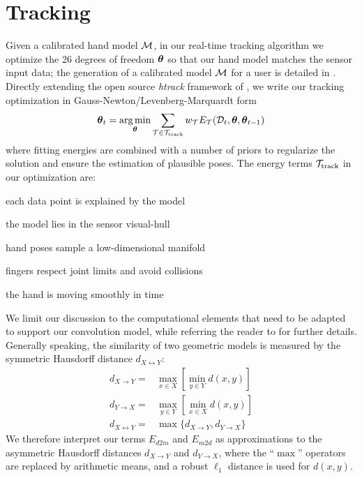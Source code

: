 

\section{Tracking}
\label{sec:tracking}
Given a calibrated hand model $\mathcal{M}$, in our real-time tracking algorithm we optimize the 26 degrees of freedom $\boldsymbol{\theta}$ so that our hand model matches the sensor input data; the generation of a calibrated model $\mathcal{M}$ for a user is detailed in . Directly extending the open source \emph{htrack} framework of \cite{tagliasacchi2015robust}, we write our tracking optimization in Gauss-Newton/Levenberg-Marquardt form
% 
\begin{eqnarray}
\boldsymbol{\theta}_t = \operatorname*{arg\,min}_{\boldsymbol{\theta}}
\sum_{\mathcal{T} \in {\mathcal{T}_\text{track}}} 
w_\mathcal{T} E_\mathcal{T}(\mathcal{D}_t,\boldsymbol{\theta},\boldsymbol{\theta}_{t-1})
\label{eq:htrack}
\end{eqnarray}
% 
where fitting energies are combined with a number of priors to regularize the solution and ensure the estimation of plausible poses. The energy terms ${\mathcal{T}_\text{track}}$ in our optimization are:
% 
\begin{description}[labelsep=0em,labelwidth=.6in,labelindent=.25cm]
    \item[d2m] each data point is explained by the model
    \item[m2d] the model lies in the sensor visual-hull
    \item[pose] hand poses sample a low-dimensional manifold
    \item[kinematic] fingers respect joint limits and avoid collisions
    \item[temporal] the hand is moving smoothly in time
\end{description}
% 
We limit our discussion to the computational elements that need to be adapted to support our convolution model, while referring the reader to \cite{tagliasacchi2015robust} for further details. 
% 
Generally speaking, the similarity of two geometric models is measured by the symmetric Hausdorff distance $d_{X \leftrightarrow Y}$:
% 
\begin{eqnarray*}
d_{X \rightarrow Y} =& \max_{x \in X} \left[ \min_{y \in Y} d(x,y) \right] \\
d_{Y \rightarrow X} =& \max_{y \in Y} \left[ \min_{x \in X} d(x,y) \right] \\
d_{X \leftrightarrow Y} =& \max \{ d_{X \rightarrow Y}, d_{Y \rightarrow X} \}
\end{eqnarray*}
We therefore interpret our terms $E_{d2m}$ and $E_{m2d}$ as approximations to the asymmetric Hausdorff distances $d_{X \rightarrow Y}$ and $d_{Y \rightarrow X}$, where the  ``$\max$'' operators are replaced by arithmetic means, and a robust $\ell_1$ distance is used for $d(x,y)$. 

